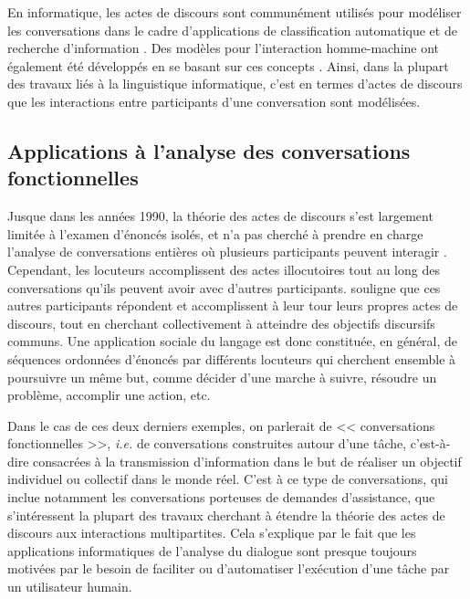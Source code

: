 \documentclass[10pt,a4paper,twoside]{article}
\begin{document}
En informatique, les actes de discours sont communément utilisés pour modéliser les conversations dans le cadre d'applications de classification automatique et de recherche d'information \cite{twitchell2004using}. Des modèles pour l'interaction homme-machine ont également été développés en se basant sur ces concepts \cite{morelli1991computational}. Ainsi, dans la plupart des travaux liés à la linguistique informatique, c’est en termes d’actes de discours que les interactions entre participants d’une conversation sont modélisées.

\subsection{Applications à l'analyse des conversations fonctionnelles}
\label{subsec:applications_in_conversation_analysis}

Jusque dans les années 1990, la théorie des actes de discours s'est largement limitée à l'examen d'énoncés isolés, et n'a pas cherché à prendre en charge l'analyse de conversations entières où plusieurs participants peuvent interagir \cite{vanderveken1994theorie}. Cependant, les locuteurs accomplissent des actes illocutoires tout au long des conversations qu'ils peuvent avoir avec d'autres participants. \citeauthor{vanderveken1994theorie} souligne que ces autres participants répondent et accomplissent à leur tour leurs propres actes de discours, tout en cherchant collectivement à atteindre des objectifs discursifs communs. Une application sociale du langage est donc constituée, en général, de séquences ordonnées d'énoncés par différents locuteurs qui cherchent ensemble à poursuivre un même but, comme décider d'une marche à suivre, résoudre un problème, accomplir une action, etc.

Dans le cas de ces deux derniers exemples, on parlerait de << conversations fonctionnelles >>, \textit{i.e.} de conversations construites autour d'une tâche, c'est-à-dire consacrées à la transmission d'information dans le but de réaliser un objectif individuel ou collectif dans le monde réel. C'est à ce type de conversations, qui inclue notamment les conversations porteuses de demandes d'assistance, que s'intéressent la plupart des travaux cherchant à étendre la théorie des actes de discours aux interactions multipartites. Cela s'explique par le fait que les applications informatiques de l'analyse du dialogue sont presque toujours motivées par le besoin de faciliter ou d'automatiser l'exécution d'une tâche par un utilisateur humain.
\end{document}
